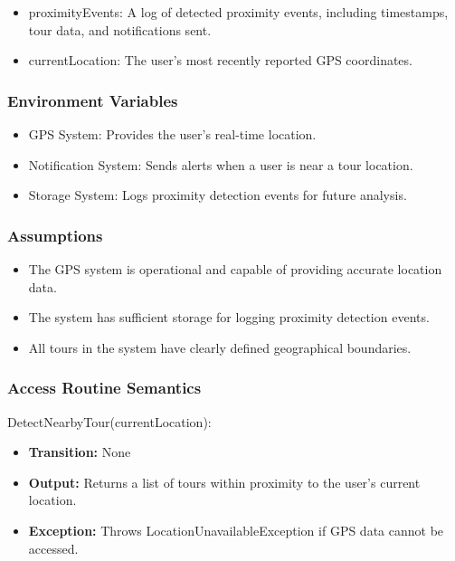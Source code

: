 \documentclass[12pt, titlepage]{article}
\begin{document}
\begin{itemize}
    \item proximityEvents: A log of detected proximity events, including timestamps, tour data, and notifications sent.
    \item currentLocation: The user's most recently reported GPS coordinates.
\end{itemize}

\subsubsection{Environment Variables}

\begin{itemize}
    \item GPS System: Provides the user's real-time location.
    \item Notification System: Sends alerts when a user is near a tour location.
    \item Storage System: Logs proximity detection events for future analysis.
\end{itemize}

\subsubsection{Assumptions}

\begin{itemize}
    \item The GPS system is operational and capable of providing accurate location data.
    \item The system has sufficient storage for logging proximity detection events.
    \item All tours in the system have clearly defined geographical boundaries.
\end{itemize}

\subsubsection{Access Routine Semantics}

\noindent DetectNearbyTour(currentLocation):
\begin{itemize}
    \item \textbf{Transition:} None
    \item \textbf{Output:} Returns a list of tours within proximity to the user's current location.
    \item \textbf{Exception:} Throws LocationUnavailableException if GPS data cannot be accessed.
\end{itemize}
\end{document}

